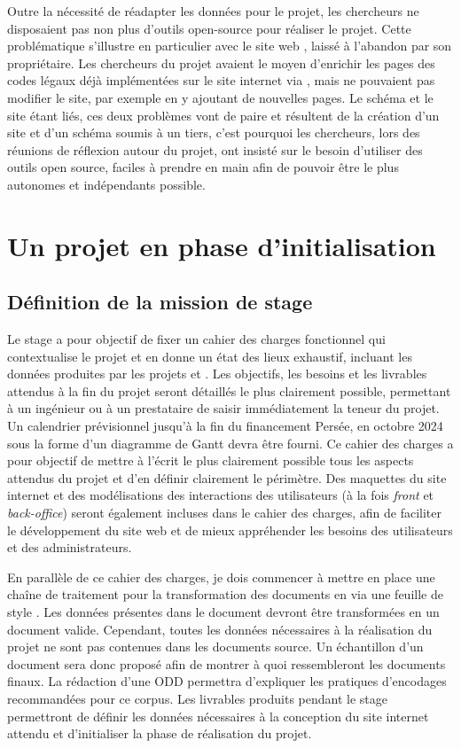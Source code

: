 Outre la nécessité de réadapter les données pour le projet, les chercheurs ne disposaient pas non plus d'outils open-source pour réaliser le projet. Cette problématique s'illustre en particulier avec le site web \LSC, laissé à l'abandon par son propriétaire. Les chercheurs du projet avaient le moyen d'enrichir les pages des codes légaux déjà implémentées sur le site internet via \FTP, mais ne pouvaient pas modifier le site, par exemple en y ajoutant de nouvelles pages. Le schéma \XML et le site \LSC étant liés, ces deux problèmes vont de paire et résultent de la création d'un site et d'un schéma soumis à un tiers, c'est pourquoi les chercheurs, lors des réunions de réflexion autour du projet, ont insisté sur le besoin d'utiliser des outils open source, faciles à prendre en main afin de pouvoir être le plus autonomes et indépendants possible. 


 \section{Un projet en phase d’initialisation}
    \subsection{Définition de la mission de stage}
Le stage a pour objectif de fixer un cahier des charges fonctionnel qui contextualise le projet et en donne un état des lieux exhaustif, incluant les données produites par les projets \LSC et \EPJ. Les objectifs, les besoins et les livrables attendus à la fin du projet seront détaillés le plus clairement possible, permettant à un ingénieur ou à un prestataire de saisir immédiatement la teneur du projet. Un calendrier prévisionnel jusqu’à la fin du financement \CollEx Persée, en octobre 2024 sous la forme d’un diagramme de Gantt devra être fourni. Ce cahier des charges a pour objectif de mettre à l’écrit le plus clairement possible tous les aspects attendus du projet et d’en définir clairement le périmètre. Des maquettes du site internet et des modélisations \UML des interactions des utilisateurs (à la fois \textit{front} et \textit{back-office}) seront également incluses dans le cahier des charges, afin de faciliter le développement du site web et de mieux appréhender les besoins des utilisateurs et des administrateurs. 

En parallèle de ce cahier des charges, je dois commencer à mettre en place une chaîne de traitement pour la transformation des documents en \XML \TEI via une feuille de style \XSL. Les données présentes dans le document \XML devront être transformées en un document \TEI valide. Cependant, toutes les données nécessaires à la réalisation du projet ne sont pas contenues dans les documents \XML source. Un échantillon d’un document \TEI sera donc proposé afin de montrer à quoi ressembleront les documents finaux. La rédaction d’une ODD permettra d'expliquer les pratiques d’encodages recommandées pour ce corpus. Les livrables produits pendant le stage permettront de définir les données nécessaires à la conception du site internet attendu et d’initialiser la phase de réalisation du projet. 


